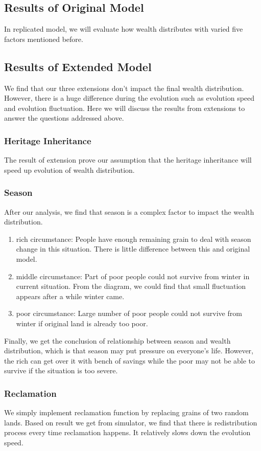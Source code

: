 \subsection{Results of Original Model}
In replicated model, we will evaluate how wealth distributes with varied  five factors mentioned before.  
\subsection{Results of Extended Model}
We find that our three extensions don't impact the final wealth distribution. However, there is a huge difference during the evolution such as evolution speed and evolution fluctuation. Here we will discuss the results from extensions to answer the questions addressed above. 
\subsubsection{Heritage Inheritance}
The result of extension prove our assumption that the heritage inheritance will speed up evolution of wealth distribution.
\subsubsection{Season}
After our analysis, we find that season is a complex factor to impact the wealth distribution.
\begin{enumerate}[I]
	\item rich circumstance: People have enough remaining grain to deal with season change in this situation. There is little difference between this and original model.
	
	\item middle circumstance: Part of poor people could not survive from winter in current situation. From the diagram, we could find that small fluctuation appears after a while winter came.  
	\item poor circumstance: Large number of  poor people could not survive from winter if original land is already too poor.
\end{enumerate}
Finally, we get the conclusion of relationship between season and wealth distribution, which is that season may put pressure on everyone's life. However, the rich can get over it with bench of savings while the poor may not be able to survive if the situation is too severe.
\subsubsection{Reclamation}
We simply implement reclamation function by replacing grains of two random lands. Based on result we get from simulator, we find that there is redistribution process every time reclamation happens. It relatively slows down the evolution speed.
